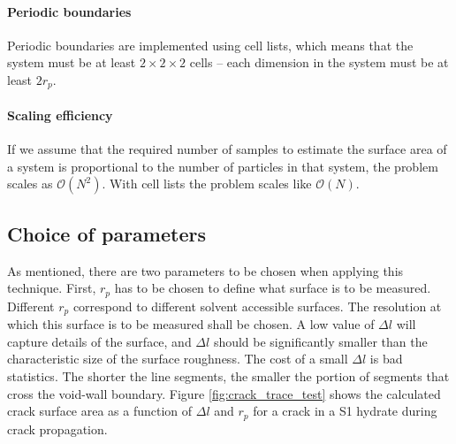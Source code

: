 \paragraph{Periodic boundaries}
Periodic boundaries are implemented using cell lists, which means that the system must be at least $2\times 2 \times 2$ cells – each dimension in the system must be at least $2r_p$.
\paragraph{Scaling efficiency}
If we assume that the required number of samples to estimate the surface area of a system is proportional to the number of particles in that system, the problem scales as $\mathcal{O}(N^2)$. With cell lists the problem scales like $\mathcal{O}(N)$.

\subsection{Choice of parameters}
As mentioned, there are two parameters to be chosen when applying this technique. First, $r_p$ has to be chosen to define what surface is to be measured. Different $r_p$ correspond to different solvent accessible surfaces. The resolution at which this surface is to be measured shall be chosen. A low value of $\Delta l$ will capture details of the surface, and $\Delta l$ should be significantly smaller than the characteristic size of the surface roughness. The cost of a small $\Delta l$ is bad statistics. The shorter the line segments, the smaller the portion of segments that cross the void-wall boundary. Figure \ref{fig:crack_trace_test} shows the calculated crack surface area as a function of $\Delta l$ and $r_p$ for a crack in a S1 hydrate during crack propagation. 

